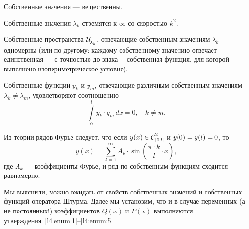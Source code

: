\begin{enumerateD}
	\item\label{l4:enum:1} Собственные значения --- вещественны.
	\item Собственные значения $\lambda_k$ стремятся к $\infty$ со скоростью $k^2$.
	\item Собственные пространства $\displaystyle \Ul[\lambda_k]$, отвечающие собственным значениям $\lambda_k$ --- одномерны (или по-другому: каждому собственному значению отвечает единственная --- с точностью до знака--- собственная функция, для которой выполнено изопериметрическое условие).
	\item Собственные функции $y_k$ и $y_m$, отвечающие различным собственным значениям $\lambda_k\neq\lambda_m${\mb,} удовлетворяют соотношению
	\begin{equation*}
		\int\limits_0^l y_k\cdot y_m\,dx=0,\quad k\neq m.
	\end{equation*}
	\item\label{l4:enum:5} Из теории рядов Фурье следует, что если $y(x)\in\Cfn[{[0,l]}]{2}$ и $y(0)\?=y(l)=0$, то 
	\begin{equation*}
		 y(x)=\sum\limits_{k=1}^{\infty} A_k\cdot\sin\left(\frac{\pi\cdot k}{l}\cdot x\right),
	\end{equation*}
	где $A_k$ --- коэффициенты Фурье{\mb,} и ряд по собственным функциям сходится равномерно. 
\end{enumerateD}

Мы выяснили, {} можно ожидать от свойств собственных значений и собственных функций оператора Штурма. Далее мы установим, что и в случае переменных (а не постоянных!) коэффициентов $Q(x)$ и $P(x)$ выполняются утверждения~\ref{l4:enum:1}--\ref{l4:enum:5}
